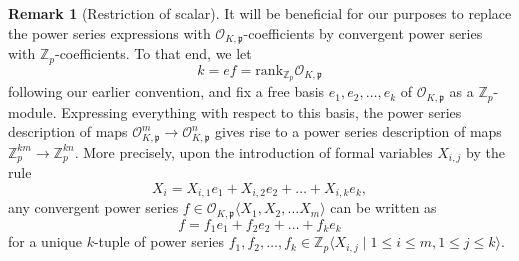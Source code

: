 \documentclass[11pt,oneside]{amsart}
\theoremstyle{plain}
\theoremstyle{definition}
\newtheorem{remark}[theorem]{Remark}
\def\Z{\mathbb{Z}}
\def\oh{\mathcal{O}}
\begin{document}

\begin{remark}[Restriction of scalar]\label{FunctionRestriction}
It will be beneficial for our purposes to replace the power series expressions with $\oh_{K, \mathfrak{p}}$-coefficients by convergent power series with $\Z_p$-coefficients. To that end, we let 
$$k=ef=\mathrm{rank}_{\Z_p}\oh_{K, \mathfrak{p}}$$ following our earlier convention, and fix a free basis $e_1, e_2, \dots, e_k$ of $\oh_{K,\mathfrak{p}}$ as a $\Z_p$-module. Expressing everything with respect to this basis, the power series description of maps $\oh_{K,\mathfrak{p}}^{m}\rightarrow \oh_{K,\mathfrak{p}}^{n}$ gives rise to a power series description of maps $\Z_p^{km}\rightarrow \Z_p^{kn}$. More precisely, upon the introduction of formal variables $X_{i,j}$ by the rule
\begin{equation}\label{VariableRestriction}
X_i=X_{i,1}e_1+X_{i,2}e_2+\dots+X_{i,k}e_k,
\end{equation} 
any convergent power series $f \in \oh_{K,\mathfrak{p}}\langle X_1, X_2, \dots X_m \rangle$ can be written as 
$$f=f_1e_1+f_2e_2+\dots +f_ke_k$$
for a unique $k$-tuple of power series $f_1, f_2, \dots, f_k \in \Z_p\langle X_{i,j}\;|\; 1\leq i \leq m, 1\leq j \leq k\rangle$.
\end{remark} 
\end{document}

